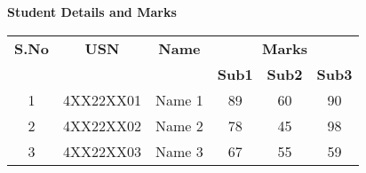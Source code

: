 \documentclass{article}
\begin{document}
\centering
\textbf{\Large Student Details and Marks}
\vspace{0.1in}

\begin{tabular}{|c|c|c|c|c|c|}
\hline
\textbf{S.No} & \textbf{USN} & \textbf{Name} & \multicolumn{3}{c|}{\textbf{Marks}} \\
\cline{4-6}
& & & \textbf{Sub1} & \textbf{Sub2} & \textbf{Sub3} \\
\hline
1 & 4XX22XX01 & Name 1 & 89 & 60 & 90 \\
2 & 4XX22XX02 & Name 2 & 78 & 45 & 98 \\
3 & 4XX22XX03 & Name 3 & 67 & 55 & 59 \\
\hline
\end{tabular}
\end{document}
